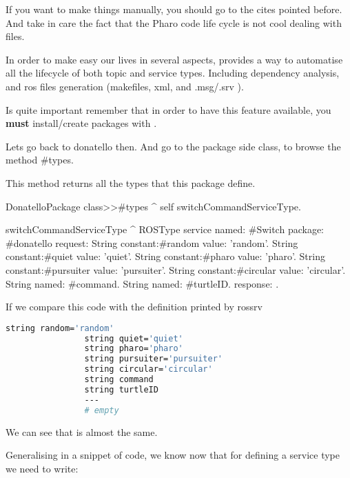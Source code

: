\documentclass[a4paper,10pt,twoside]{book}
\begin{document}
				If you want to make things manually, you should go to the cites pointed before. And take in care the fact that the Pharo code life cycle is not cool dealing with files. 
				
				In order to make easy our lives in several aspects, \installationTool{} provides a way to automatise all the lifecycle of both topic and service types. Including dependency analysis, and ros files generation (makefiles, xml, and .msg/.srv ). 
				
				Is quite important remember that in order to have this feature available, you \textbf{must} install/create packages with \installationTool{}.
				
				
				Lets go back to donatello then. And go to the package side class, to browse the method \#types. 
				
				This method returns all the types that this package define. 
				
				
				\begin{code}
				DonatelloPackage class>>#types
					^ { 
						self switchCommandServiceType.
					 }
					 
				\end{code}
				
				\begin{code}
				switchCommandServiceType
					^
						ROSType service named: #Switch package: #donatello request:{
							String constant:#random value: 'random'.
							String constant:#quiet value: 'quiet'.
							String constant:#pharo value: 'pharo'.
							String constant:#pursuiter value: 'pursuiter'.
							String constant:#circular value: 'circular'.
							String named: #command.
							String named: #turtleID.
						} response: { 
						}.
				
				\end{code}
				
				If we compare this code with the definition printed by rossrv
				
			 \begin{lstlisting}[language=bash,title={ donatello/Switch definition }]
				string random='random'
				string quiet='quiet'
				string pharo='pharo'
				string pursuiter='pursuiter'
				string circular='circular'
				string command
				string turtleID
				---
				# empty
			\end{lstlisting}
			
				We can see that is almost the same. 
				
				Generalising in a snippet of code, we know now that for defining a service type we need to write:
				
\end{document}

